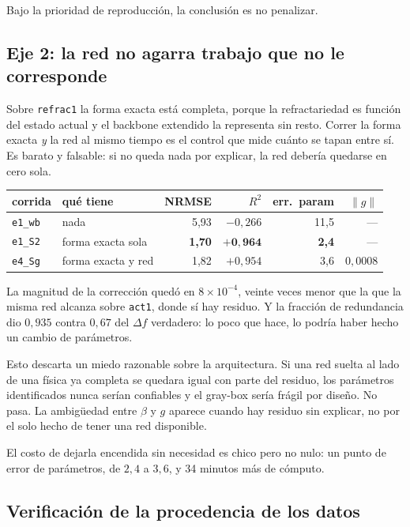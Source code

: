 \documentclass[11pt,a4paper]{article}
\begin{document}
Bajo la prioridad de reproducción, la conclusión es no penalizar.

\subsection{Eje 2: la red no agarra trabajo que no le corresponde}

Sobre \texttt{refrac1} la forma exacta está completa, porque la refractariedad
es función del estado actual y el backbone extendido la representa sin resto.
Correr la forma exacta \emph{y} la red al mismo tiempo es el control que mide
cuánto se tapan entre sí. Es barato y falsable: si no queda nada por explicar,
la red debería quedarse en cero sola.

\begin{center}
\small
\begin{tabular}{llrrrr}
\toprule
\textbf{corrida} & \textbf{qué tiene} & \textbf{NRMSE} & \textbf{$R^2$} &
\textbf{err.\ param} & \textbf{$\lVert g \rVert$} \\
\midrule
\texttt{e1\_wb}  & nada                  & 5{,}93 & $-0{,}266$ & 11{,}5 & --- \\
\texttt{e1\_S2}  & forma exacta sola     & \textbf{1{,}70} & $\mathbf{+0{,}964}$ & \textbf{2{,}4} & --- \\
\texttt{e4\_Sg}  & forma exacta y red    & 1{,}82 & $+0{,}954$ & 3{,}6 & $0{,}0008$ \\
\bottomrule
\end{tabular}
\end{center}

La magnitud de la corrección quedó en $8 \times 10^{-4}$, veinte veces menor que
la que la misma red alcanza sobre \texttt{act1}, donde sí hay residuo. Y la
fracción de redundancia dio $0{,}935$ contra $0{,}67$ del $\Delta f$ verdadero:
lo poco que hace, lo podría haber hecho un cambio de parámetros.

Esto descarta un miedo razonable sobre la arquitectura. Si una red suelta al
lado de una física ya completa se quedara igual con parte del residuo, los
parámetros identificados nunca serían confiables y el gray-box sería frágil por
diseño. No pasa. La ambigüedad entre $\beta$ y $g$ aparece cuando hay residuo
sin explicar, no por el solo hecho de tener una red disponible.

El costo de dejarla encendida sin necesidad es chico pero no nulo: un punto de
error de parámetros, de $2{,}4$ a $3{,}6$, y 34 minutos más de cómputo.

\subsection{Verificación de la procedencia de los datos}
\end{document}
